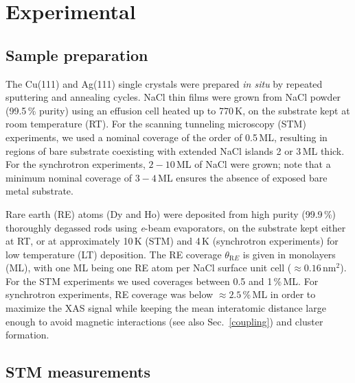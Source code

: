 \begin{abstract}

\end{abstract}

\maketitle

\setlength{\parskip}{3pt}
\renewcommand{\thefigure}{S\arabic{figure}}
\renewcommand{\thetable}{S\arabic{table}}

\section{Experimental}

\subsection{Sample preparation}

The Cu(111) and Ag(111) single crystals were prepared \textit{in situ} by repeated sputtering and   annealing cycles. NaCl thin films were grown from NaCl powder (99.5\,\% purity) using an effusion cell heated up to 770\,K, on the substrate kept at room temperature (RT). For the scanning tunneling microscopy (STM) experiments, we used a nominal coverage of the order of 0.5\,ML, resulting in regions of bare substrate coexisting with extended NaCl islands 2 or 3\,ML thick. For the synchrotron experiments, $2-10$\,ML of NaCl were grown; note that a minimum nominal coverage of $ 3-4$\,ML ensures the absence of exposed bare metal substrate.

Rare earth (RE) atoms (Dy and Ho) were deposited from high purity (99.9\,\%) thoroughly degassed rods using \textit{e}-beam evaporators, on the substrate kept either at RT, or at approximately 10\,K (STM) and 4\,K (synchrotron experiments) for low temperature (LT) deposition. The RE coverage $\theta_{\mathrm RE}$ is given in monolayers (ML), with one ML being one RE atom per NaCl surface unit cell ($\approx 0.16$\,nm$^2$). For the STM experiments we used coverages between 0.5 and 1\,\%\,ML. For synchrotron experiments, RE coverage was below $\approx 2.5$\,\%\,ML in order to maximize the XAS signal while keeping the mean interatomic distance large enough to avoid magnetic interactions (see also Sec.~\ref{coupling}) and cluster formation.

\subsection{STM measurements}

